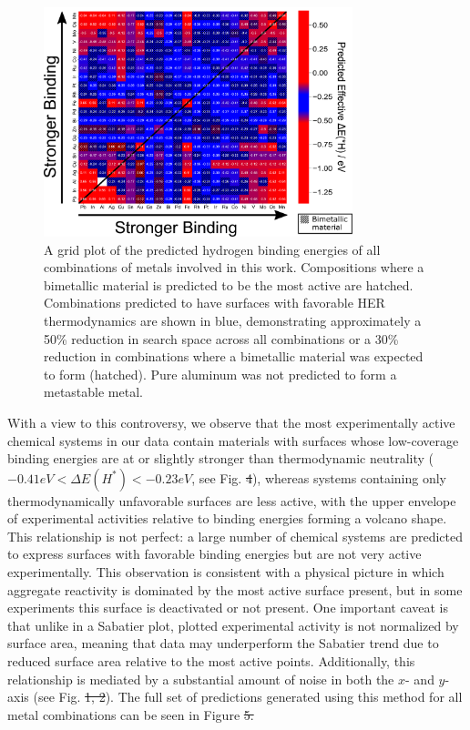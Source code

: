\documentclass[preprint,12pt]{elsarticle}
\providecommand{\DIFadd}[1]{{\protect\color{blue}\uwave{#1}}} %
\providecommand{\DIFdel}[1]{{\protect\color{red}\sout{#1}}}                      %
\providecommand{\DIFaddbegin}{} %
\providecommand{\DIFaddend}{} %
\providecommand{\DIFdelbegin}{} %
\providecommand{\DIFdelend}{} %
\providecommand{\DIFaddbeginFL}{} %
\providecommand{\DIFaddendFL}{} %
\newcommand{\DIFscaledelfig}{0.5}
\newlength{\DIFdelgraphicswidth} %
\newlength{\DIFdelgraphicsheight} %
\newcommand{\DIFaddincludegraphics}[2][]{{\color{blue}\fbox{\DIFOincludegraphics[#1]{#2}}}} %
\newcommand{\DIFdelincludegraphics}[2][]{%
\sbox{\DIFdelgraphicsbox}{\DIFOincludegraphics[#1]{#2}}%
\settoboxwidth{\DIFdelgraphicswidth}{\DIFdelgraphicsbox} %
\settoboxtotalheight{\DIFdelgraphicsheight}{\DIFdelgraphicsbox} %
\scalebox{\DIFscaledelfig}{%
\parbox[b]{\DIFdelgraphicswidth}{\usebox{\DIFdelgraphicsbox}\\[-\baselineskip] \rule{\DIFdelgraphicswidth}{0em}}\llap{\resizebox{\DIFdelgraphicswidth}{\DIFdelgraphicsheight}{%
\setlength{\unitlength}{\DIFdelgraphicswidth}%
\begin{picture}(1,1)%
\thicklines\linethickness{2pt} %
{\color[rgb]{1,0,0}\put(0,0){\framebox(1,1){}}}%
{\color[rgb]{1,0,0}\put(0,0){\line( 1,1){1}}}%
{\color[rgb]{1,0,0}\put(0,1){\line(1,-1){1}}}%
\end{picture}%
}\hspace*{3pt}}} %
} %
\DeclareRobustCommand{\DIFaddbegin}{\DIFOaddbegin \let\includegraphics\DIFaddincludegraphics} %
\DeclareRobustCommand{\DIFaddend}{\DIFOaddend \let\includegraphics\DIFOincludegraphics} %
\DeclareRobustCommand{\DIFdelbegin}{\DIFOdelbegin \let\includegraphics\DIFdelincludegraphics} %
\DeclareRobustCommand{\DIFdelend}{\DIFOaddend \let\includegraphics\DIFOincludegraphics} %
\DeclareRobustCommand{\DIFaddbeginFL}{\DIFOaddbeginFL \let\includegraphics\DIFaddincludegraphics} %
\DeclareRobustCommand{\DIFaddendFL}{\DIFOaddendFL \let\includegraphics\DIFOincludegraphics} %
\begin{document}
\begin{figure}[h]
\centering
    \includegraphics[width=0.8\textwidth]{figures/fig_5.pdf}
\caption{A grid plot of the predicted hydrogen binding energies of all combinations of metals involved in this work. Compositions where a bimetallic material is predicted to be the most active are hatched. Combinations predicted to have surfaces with favorable HER thermodynamics are shown in blue, demonstrating approximately a 50\% reduction in search space across all combinations or a 30\% reduction in combinations where a bimetallic material was expected to form (hatched). Pure aluminum was not predicted to form a metastable metal.
}
\DIFaddbeginFL \label{figure_5}
\DIFaddendFL \end{figure}

With a view to this controversy, we observe that the most experimentally active chemical systems in our data contain materials with surfaces whose low-coverage binding energies are at or slightly stronger than thermodynamic neutrality ($-0.41 eV < \Delta E(H^*) < -0.23 eV$, see Fig. \DIFdelbegin \DIFdel{4}\DIFdelend \DIFaddbegin \DIFadd{\ref{figure_4}}\DIFaddend ), whereas systems containing only thermodynamically unfavorable surfaces are less active, with the upper envelope of experimental activities relative to binding energies forming a volcano shape. This relationship is not perfect: a large number of chemical systems are predicted to express surfaces with favorable binding energies but are not very active experimentally. This observation is consistent with a physical picture in which aggregate reactivity is dominated by the most active surface present, but in some experiments this surface is deactivated or not present. One important caveat is that unlike in a Sabatier plot, plotted experimental activity is not normalized by surface area, meaning that data may underperform the Sabatier trend due to reduced surface area relative to the most active points. Additionally, this relationship is mediated by a substantial amount of noise in both the $x$- and $y$-axis (see Fig. \DIFdelbegin \DIFdel{1, 2}\DIFdelend \DIFaddbegin \DIFadd{\ref{figure_1}, \ref{figure_2}}\DIFaddend ). The full set of predictions generated using this method for all metal combinations can be seen in Figure \DIFdelbegin \DIFdel{5.
}\DIFdelend \DIFaddbegin \DIFadd{\ref{figure_5}.
}\DIFaddend 
\end{document}

